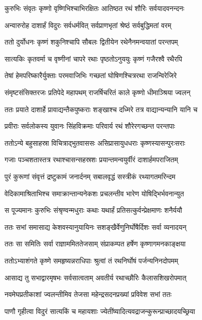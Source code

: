 \twolineshloka
{कुरुभिः संवृतः कृष्णो वृष्णिभिश्चाभिरक्षितः}
{आतिष्ठत रथं शौरिः सर्वयादवनन्दनः}


\twolineshloka
{अन्वारुरोह दाशार्हं विदुरः सर्वधर्मवित्}
{सर्वप्राणभृतां श्रेष्ठं सर्वबुद्धिमतां वरम्}


\twolineshloka
{ततो दुर्योधनः कृष्णं शकुनिश्चापि सौबलः}
{द्वितीयेन रथेनैनमन्वयातां परन्तपम्}


\twolineshloka
{सात्यकिः कृतवर्मा च वृष्णीनां चापरे रथाः}
{पृष्ठतोऽनुययुः कृष्णं गजैरश्वै रथैरपि}


\twolineshloka
{तेषां हेमपरिष्कारैर्युक्ताः परमवाजिभिः}
{गच्छतां घोषिणश्चित्ररथा राजन्विरेजिरे}


\twolineshloka
{संमृष्टसंसिक्तरजः प्रतिपेदे महापथम्}
{राजर्षिचरितं काले कृष्णो धीमाञ्श्रिया ज्वलन्}


\twolineshloka
{ततः प्रयाते दाशार्हे प्रावाद्यन्तैकपुष्कराः}
{शङ्खाश्च दध्मिरे तत्र वाद्यान्यन्यानि यानि च}


\twolineshloka
{प्रवीराः सर्वलोकस्य युवानः सिंहविक्रमाः}
{परिवार्य रथं शौरेरगच्छन्त परन्तपाः}


\twolineshloka
{ततोऽन्ये बहुसाहस्रा विचित्राद्भुतवाससः}
{असिप्रासायुधधराः कृष्णस्यासन्पुरःसराः}


\twolineshloka
{गजाः पञ्चशतास्तत्र रथाश्चासन्सहस्रशः}
{प्रयान्तमन्वयुर्वीरं दाशार्हमपराजितम्}


\twolineshloka
{पुरं कुरूणां संवृत्तं द्रष्टुकामं जनार्दनम्}
{सबालवृद्धं सस्त्रीकं रथ्यागतमरिन्दम}


\twolineshloka
{वेदिकामाश्रिताभिश्च समाक्रान्तान्यनेकशः}
{प्रचलन्तीव भारेण योषिद्भिर्भवनान्युत}


\twolineshloka
{स पूज्यमानः कुरुभिः संश्रृण्वन्मधुराः कथाः}
{यथार्हं प्रतिसत्कुर्वन्प्रेक्षमाणः शनैर्ययौ}


\twolineshloka
{ततः सभां समासाद्य केशवस्यानुयायिनः}
{सशङ्खैर्वेणुनिर्घोषैर्दिशः सर्वा व्यनादयन्}


\twolineshloka
{ततः सा समितिः सर्वा राज्ञाममिततेजसाम्}
{संप्राकम्पत हर्षेण कृष्णागमनकाङ्क्षया}


\twolineshloka
{ततोऽभ्याशंगते कृष्णे समहृष्यन्नराधिपाः}
{श्रुत्वां तं रथनिर्घोषं पर्जन्यनिनदोपमम्}


\twolineshloka
{आसाद्य तु सभाद्वारमृषभः सर्वसात्वताम्}
{अवतीर्य रथाच्छौरिः कैलासशिखरोपमात्}


\twolineshloka
{नवमेघप्रतीकाशां ज्वलन्तीमिव तेजसा}
{महेन्द्रसदनप्रख्यां प्रविवेश सभां ततः}


\twolineshloka
{पाणौ गृहीत्वा विदुरं सात्यकिं च महायशाः}
{ज्येतींष्यादित्यवद्राजन्कुरून्प्राच्छादयच्छ्रिया}


